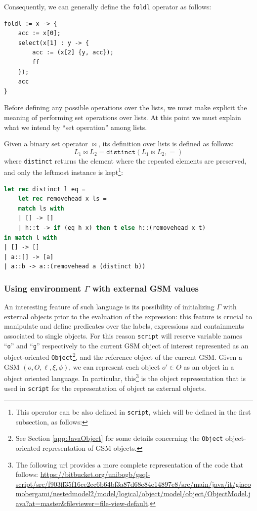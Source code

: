 Consequently, we can generally define the \texttt{foldl} operator as follows:
\begin{lstlisting}[language=Script]
foldl := x -> {
	acc := x[0];
	select(x[1] : y -> {
		acc := (x[2] {y, acc});
		ff
	});
	acc
}
\end{lstlisting}

Before defining any possible operations over the lists, we must make explicit the meaning of performing set operations over lists.
At this point we must explain what we intend by ``set operation'' among lists.

\begin{definition}
	Given a binary set operator $\bowtie$, its definition over lists is defined as follows:
	\[L_1\bowtie L_2 = \texttt{distinct}(L_1\bowtie L_2,=)\]
	where \texttt{distinct} returns the element where the repeated elements are preserved, and only the leftmost instance is kept\footnote{This operator can be also defined in \texttt{script}, which will be defined in the first subsection, as follows: }:
\begin{lstlisting}[language=Caml]
let rec distinct l eq =
	let rec removehead x ls =
	match ls with
	| [] -> []
	| h::t -> if (eq h x) then t else h::(removehead x t)
in match l with
| [] -> []
| a::[] -> [a]
| a::b -> a::(removehead a (distinct b))
\end{lstlisting}
\end{definition}

\subsubsection{Using environment $\Gamma$ with external GSM values}\label{label:ucwegsmv}
An interesting feature of such language is its possibility of initializing $\Gamma$ with external objects prior to the evaluation of the expression: this feature is crucial to manipulate and define predicates over the labels, expressions and containments associated to single objects. For this reason \texttt{script} will reserve variable names ``\texttt{o}'' and ``\texttt{g}'' respectively to the current GSM object of interest represented as an object-oriented \texttt{Object}\footnote{See Section \vref{app:JavaObject} for some details concerning the \texttt{Object} object-oriented representation of GSM objects.}, and the reference object of the current GSM.
\label{app:JavaObject}
Given a GSM $(o,O,\ell,\xi,\phi)$, we can represent each object $o'\in O$ as an object in a object oriented language. In particular, this\footnote{The following url provides a more complete representation of the code that follows: \url{https://bitbucket.org/unibogb/gsql-script/src/f903ff35f16ce2ec6b64bf3a87d68e84e14897e8/src/main/java/it/giacomobergami/nestedmodel2/model/logical/object/model/object/ObjectModel.java?at=master&fileviewer=file-view-default}.} is the object representation that is used in \texttt{script} for the representation of object as external objects.

